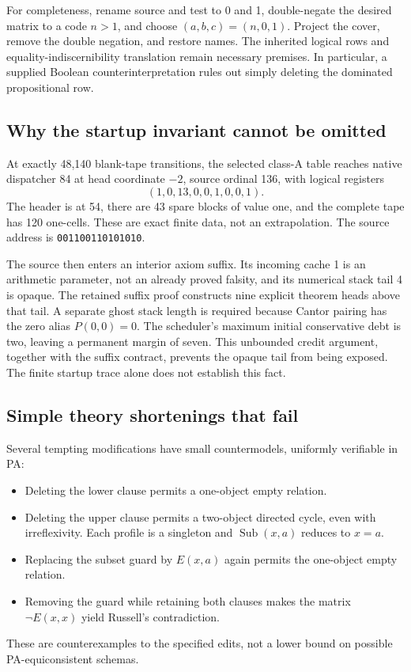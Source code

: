 \documentclass[11pt,a4paper]{article}
\newcommand{\Sub}{\operatorname{Sub}}
\newcommand{\code}[1]{\texttt{#1}}
\begin{document}
For completeness, rename source and test to 0 and 1, double-negate the
desired matrix to a code $n>1$, and choose $(a,b,c)=(n,0,1)$. Project the
cover, remove the double negation, and restore names. The inherited logical
rows and equality-indiscernibility translation remain necessary premises.
In particular, a supplied Boolean counterinterpretation rules out simply
deleting the dominated propositional row.

\subsection{Why the startup invariant cannot be omitted}

At exactly 48,140 blank-tape transitions, the selected class-A table reaches
native dispatcher 84 at head coordinate $-2$, source ordinal 136, with
logical registers
\[
(1,0,13,0,0,1,0,0,1).
\]
The header is at 54, there are 43 spare blocks of value one, and the complete
tape has 120 one-cells. These are exact finite data, not an extrapolation.
The source address is \code{001100110101010}.

The source then enters an interior axiom suffix. Its incoming cache 1 is
an arithmetic parameter, not an already proved falsity, and its numerical
stack tail 4 is opaque. The retained suffix proof constructs nine explicit
theorem heads above that tail. A separate ghost stack length is required
because Cantor pairing has the zero alias $P(0,0)=0$. The scheduler's maximum
initial conservative debt is two, leaving a permanent margin of seven.
This unbounded credit argument, together with the suffix contract, prevents
the opaque tail from being exposed. The finite startup trace alone does
not establish this fact.

\subsection{Simple theory shortenings that fail}

Several tempting modifications have small countermodels, uniformly
verifiable in PA:
\begin{itemize}
\item Deleting the lower clause permits a one-object empty relation.
\item Deleting the upper clause permits a two-object directed cycle, even
      with irreflexivity. Each profile is a singleton and $\Sub(x,a)$ reduces
      to $x=a$.
\item Replacing the subset guard by $E(x,a)$ again permits the one-object
      empty relation.
\item Removing the guard while retaining both clauses makes the matrix
      $\neg E(x,x)$ yield Russell's contradiction.
\end{itemize}
These are counterexamples to the specified edits, not a lower bound on
possible PA-equiconsistent schemas.
\end{document}
